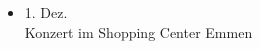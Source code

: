 \begin{multicols}{2}
\begin{itemize}
        \item[]1. Dez.\\
        Konzert im Shopping Center Emmen

    \end{itemize}

\end{multicols}
